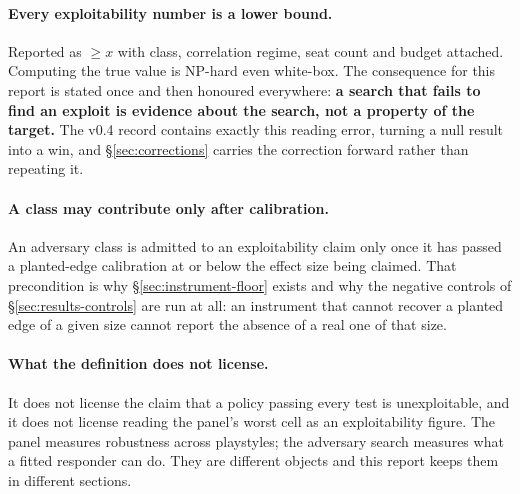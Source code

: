 \paragraph{Every exploitability number is a lower bound.}
Reported as $\ge x$ with class, correlation regime, seat count and budget attached. Computing the true
value is NP-hard even white-box. The consequence for this report is stated once and then honoured
everywhere: \textbf{a search that fails to find an exploit is evidence about the search, not a
property of the target.} The v0.4 record contains exactly this reading error, turning a null result
into a win, and \S\ref{sec:corrections} carries the correction forward rather than repeating it.

\paragraph{A class may contribute only after calibration.}
An adversary class is admitted to an exploitability claim only once it has passed a planted-edge
calibration at or below the effect size being claimed. That precondition is why
\S\ref{sec:instrument-floor} exists and why the negative controls of \S\ref{sec:results-controls}
are run at all: an instrument that cannot recover a planted edge of a given size cannot report the
absence of a real one of that size.

\paragraph{What the definition does not license.}
It does not license the claim that a policy passing every test is unexploitable, and it does not
license reading the panel's worst cell as an exploitability figure. The panel measures robustness
across playstyles; the adversary search measures what a fitted responder can do. They are different
objects and this report keeps them in different sections.

